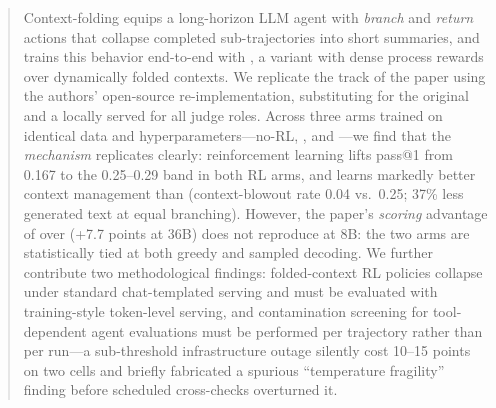 \begin{abstract}
Context-folding \citep{sun2025contextfolding} equips a long-horizon LLM agent with
\emph{branch} and \emph{return} actions that collapse completed sub-trajectories into short
summaries, and trains this behavior end-to-end with \foldgrpo{}, a \grpo{} variant with dense
process rewards over dynamically folded contexts. We replicate the \bcplus{} track of the paper
using the authors' open-source re-implementation, substituting \qwen{} for the original
\seedoss{} and a locally served \judgemodel{} for all judge roles. Across three arms trained on
identical data and hyperparameters---no-RL, \grpo{}, and \foldgrpo{}---we find that the
\emph{mechanism} replicates clearly: reinforcement learning lifts pass@1 from 0.167 to the
0.25--0.29 band in both RL arms, and \foldgrpo{} learns markedly better context management than
\grpo{} (context-blowout rate 0.04 vs.\ 0.25; 37\% less generated text at equal branching).
However, the paper's \emph{scoring} advantage of \foldgrpo{} over \grpo{} (+7.7 points at 36B)
does not reproduce at 8B: the two arms are statistically tied at both greedy and sampled
decoding. We further contribute two methodological findings: folded-context RL policies
collapse under standard chat-templated serving and must be evaluated with training-style
token-level serving, and contamination screening for tool-dependent agent evaluations must be
performed per trajectory rather than per run---a sub-threshold infrastructure outage silently
cost 10--15 points on two cells and briefly fabricated a spurious ``temperature fragility''
finding before scheduled cross-checks overturned it.
\end{abstract}
